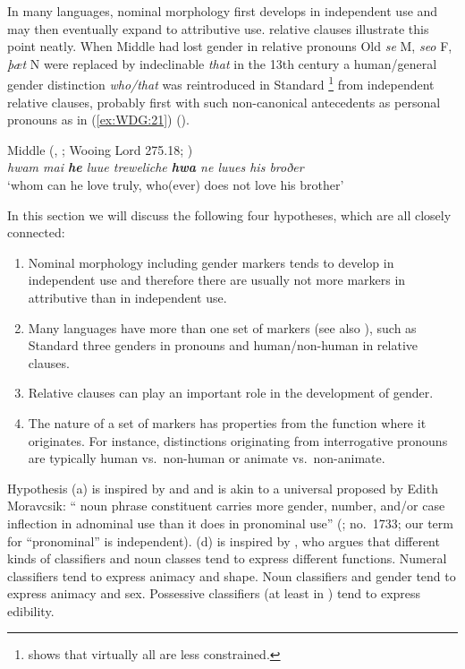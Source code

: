 \documentclass[output=collectionpaper]{langsci/langscibook}
\begin{document}
In many languages, nominal morphology first develops in independent use and may then eventually expand to attributive use.  relative clauses illustrate this point neatly. When Middle  had lost gender in relative pronouns \textendash{} Old  \textit{se} M, \textit{seo} F, \textit{þæt} N were replaced by indeclinable \textit{that} in the 13th century \textendash{} a human/general gender distinction \textit{who/that} was reintroduced in Standard %
\footnote{%
\cite{Herrmann2005} shows that virtually all  are less constrained.
} %
from independent relative clauses, probably first with such non-canonical antecedents as personal pronouns as in (\ref{ex:WDG:21}) (\citealt[91--93]{Fischer2000}).

\ea\label{ex:WDG:21}
Middle  (, ; Wooing Lord 275.18; \citealt{Fischer2000})\\
	\textit{hwam mai \textbf{he} luue treweliche \textbf{hwa} ne luues his broðer}\\
	`whom can he love truly, who(ever) does not love his brother' \\
\z

In this section we will discuss the following four hypotheses, which are all closely connected:

\begin{enumerate}[label=(\alph*)]
\item Nominal morphology \textendash{} including gender markers \textendash{} tends to develop in independent use and therefore there are usually not more markers in attributive than in independent use.
\item Many languages have more than one set of markers (see also \citealt{Dahl2000}), such as Standard  three genders in pronouns and human/non-human in relative clauses.
\item Relative clauses can play an important role in the development of gender.
\item The nature of a set of markers has properties from the function where it originates. For instance, distinctions originating from interrogative pronouns are typically human vs.\ non-human or animate vs.\ non-animate.
\end{enumerate}

Hypothesis (a) is inspired by \cite{Lehmann1982} and \cite[233; based on ]{Heine1984} and is akin to a universal proposed by Edith Moravcsik: `` noun phrase constituent carries more gender, number, and/or case inflection in adnominal use than it does in pronominal use'' (\citealt{Moravcsik1994}; \citeauthor{UniArchive} no.~1733; our term for ``pronominal'' is independent). (d) is inspired by \cite{Croft1994}, who argues that different kinds of classifiers and noun classes tend to express different functions. Numeral classifiers tend to express animacy and shape. Noun classifiers and gender tend to express animacy and sex. Possessive classifiers (at least in ) tend to express edibility.
\end{document}
